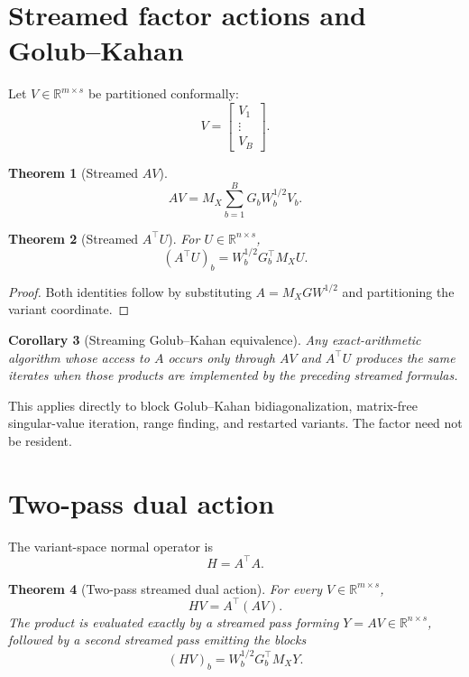\documentclass[11pt]{article}
\newtheorem{theorem}{Theorem}[section]
\newtheorem{corollary}[theorem]{Corollary}
\theoremstyle{definition}
\theoremstyle{remark}
\begin{document}
\section{Streamed factor actions and Golub--Kahan}

Let \(V\in\mathbb R^{m\times s}\) be partitioned conformally:
\[
V=
\begin{bmatrix}
V_1\\
\vdots\\
V_B
\end{bmatrix}.
\]

\begin{theorem}[Streamed \(AV\)]
\[
\boxed{
AV
=
M_X
\sum_{b=1}^B
G_bW_b^{1/2}V_b.
}
\]
\end{theorem}

\begin{theorem}[Streamed \(A^\top U\)]
For \(U\in\mathbb R^{n\times s}\),
\[
\boxed{
(A^\top U)_b
=
W_b^{1/2}G_b^\top M_XU.
}
\]
\end{theorem}

\begin{proof}
Both identities follow by substituting
\(A=M_XGW^{1/2}\) and partitioning the variant coordinate.
\end{proof}

\begin{corollary}[Streaming Golub--Kahan equivalence]
Any exact-arithmetic algorithm whose access to \(A\) occurs only through
\(AV\) and \(A^\top U\) produces the same iterates when those products are
implemented by the preceding streamed formulas.
\end{corollary}

This applies directly to block Golub--Kahan bidiagonalization, matrix-free
singular-value iteration, range finding, and restarted variants.  The
factor need not be resident.

\section{Two-pass dual action}

The variant-space normal operator is
\[
H=A^\top A.
\]

\begin{theorem}[Two-pass streamed dual action]
For every \(V\in\mathbb R^{m\times s}\),
\[
\boxed{
HV=A^\top(AV).
}
\]
The product is evaluated exactly by a streamed pass forming
\(Y=AV\in\mathbb R^{n\times s}\), followed by a second streamed pass
emitting the blocks
\[
(HV)_b=W_b^{1/2}G_b^\top M_XY.
\]
\end{theorem}
\end{document}

